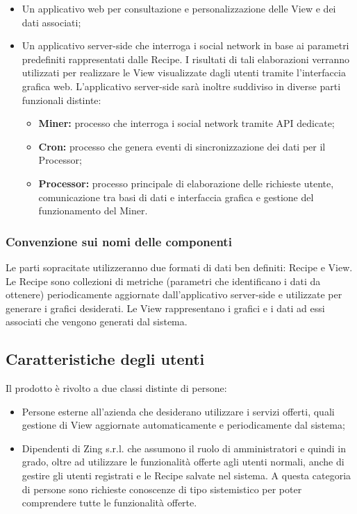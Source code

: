 \begin{itemize}
\item Un applicativo web per consultazione e personalizzazione delle View e dei dati associati;
\item Un applicativo server-side che interroga i social network in base ai parametri predefiniti rappresentati dalle Recipe. I risultati di tali elaborazioni verranno utilizzati per realizzare le View visualizzate dagli utenti tramite l'interfaccia grafica web.
  L'applicativo server-side sarà inoltre suddiviso in diverse parti funzionali distinte:
  \begin{itemize}
    \item \textbf{Miner:} processo che interroga i social network tramite API dedicate;
    \item \textbf{Cron:} processo che genera eventi di sincronizzazione dei dati per il Processor;
    \item \textbf{Processor:} processo principale di elaborazione delle richieste utente, comunicazione tra basi di dati e interfaccia grafica e gestione del funzionamento del Miner.
  \end{itemize}
\end{itemize}

\subsubsection{Convenzione sui nomi delle componenti}
Le parti sopracitate utilizzeranno due formati di dati ben definiti: Recipe e View.
Le Recipe sono collezioni di metriche (parametri che identificano i dati da ottenere) periodicamente aggiornate dall'applicativo server-side e utilizzate per generare i grafici desiderati. \newline
Le View rappresentano i grafici e i dati ad essi associati che vengono generati dal sistema.

\subsection{Caratteristiche degli utenti}
Il prodotto è rivolto a due classi distinte di persone:

\begin{itemize}
  \item Persone esterne all'azienda che desiderano utilizzare i servizi offerti, quali gestione di View aggiornate automaticamente e periodicamente dal sistema;
  \item Dipendenti di Zing s.r.l. che assumono il ruolo di amministratori e quindi in grado, oltre ad utilizzare le funzionalità offerte agli utenti normali, anche di gestire gli utenti registrati e le Recipe salvate nel sistema.
  A questa categoria di persone sono richieste conoscenze di tipo sistemistico per poter comprendere tutte le funzionalità offerte.
\end{itemize}


